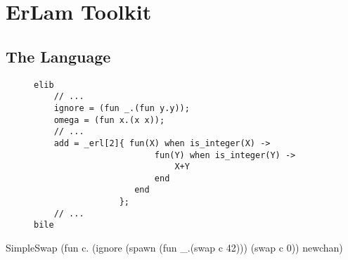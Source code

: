 \section{ErLam Toolkit}

\subsection{The Language}

\begin{slide}
    \begin{figure}
    \centering
        {\footnotesize
            
        }
    \label{fig:grammer}
    \end{figure}

\end{slide}

\begin{slide}
    \begin{figure}
    \centering
    \begin{BVerbatim}
elib
    // ...
    ignore = (fun _.(fun y.y));
    omega = (fun x.(x x));
    // ...
    add = _erl[2]{ fun(X) when is_integer(X) ->
                        fun(Y) when is_integer(Y) ->
                            X+Y
                        end
                    end
                 };
    // ...
bile
    \end{BVerbatim}
    \end{figure}

\end{slide}

\begin{SaveVerbatim}{SimpleSwap}
(fun c.
     (ignore 
       (spawn (fun _.(swap c 42)))
       (swap c 0))
 newchan)
\end{SaveVerbatim}

